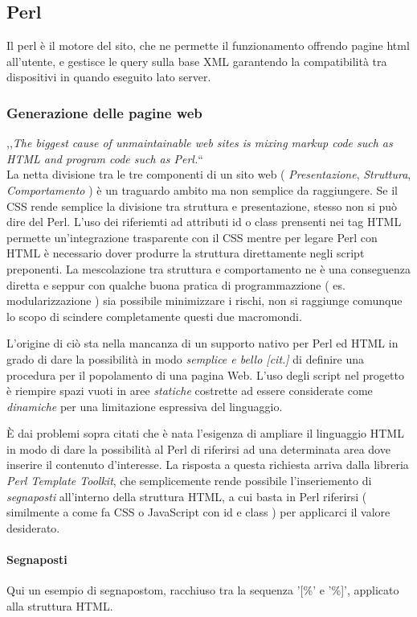 \subsection{Perl}
Il perl \`e il motore del sito, che ne permette il funzionamento offrendo pagine html all'utente, e gestisce le query sulla base XML garantendo la compatibilit\`a tra dispositivi in quando eseguito lato server.
\subsubsection{Generazione delle pagine web}
,,\textit{The biggest cause of unmaintainable web sites is mixing markup code such as HTML and program code such as Perl.}``\\

La netta divisione tra le tre componenti di un sito web ( \textit{Presentazione}, \textit{Struttura}, \textit{Comportamento} ) \`e un traguardo ambito ma non semplice da raggiungere. Se il CSS rende semplice la divisione tra struttura e presentazione, stesso non si pu\`o dire del Perl. L'uso dei riferiemti ad attributi id o class prensenti nei tag HTML permette un'integrazione trasparente con il CSS mentre per legare Perl con HTML \`e necessario dover produrre la struttura direttamente negli script preponenti. La mescolazione tra struttura e comportamento ne \`e una conseguenza diretta e seppur con qualche buona pratica di programmazzione ( es. modularizzazione ) sia possibile minimizzare i rischi, non si raggiunge comunque lo scopo di scindere completamente questi due macromondi.

L'origine di ci\`o sta nella mancanza di un supporto nativo per Perl ed HTML in grado di dare la possibilit\`a in modo \textit{semplice e bello [cit.]} di definire una procedura per il popolamento di una pagina Web. L'uso degli script nel progetto \`e riempire spazi vuoti in aree \textit{statiche} costrette ad essere considerate come \textit{dinamiche} per una limitazione espressiva del linguaggio.

\`E dai problemi sopra citati che \`e nata l'esigenza di ampliare il linguaggio HTML in modo di dare la possibilit\`a al Perl di riferirsi ad una determinata area dove inserire il contenuto d'interesse. La risposta a questa richiesta arriva dalla libreria \textit{Perl Template Toolkit}, che semplicemente rende possibile l'inseriemento di \textit{segnaposti} all'interno della struttura HTML, a cui basta in Perl riferirsi ( similmente a come fa CSS o JavaScript con id e class ) per applicarci il valore desiderato.
\paragraph*{Segnaposti} Qui un esempio di segnapostom, racchiuso tra la sequenza '[\%' e '\%]', applicato alla struttura HTML. 


